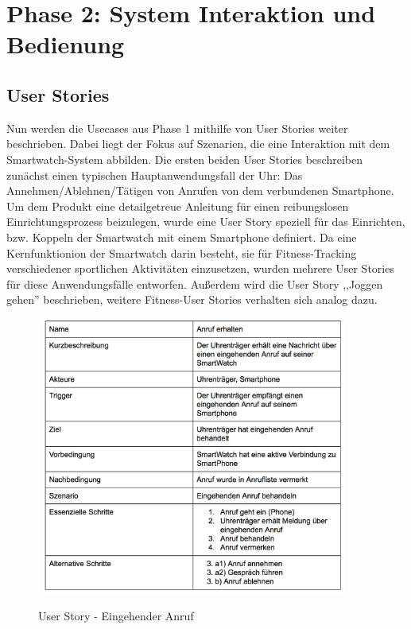 \chapter{Phase 2: System Interaktion und Bedienung}

\section{User Stories}

Nun werden die Usecases aus Phase 1 mithilfe von User Stories weiter beschrieben. Dabei liegt der Fokus auf Szenarien, die eine Interaktion mit dem Smartwatch-System abbilden.
Die ersten beiden User Stories beschreiben zunächst einen typischen Hauptanwendungsfall der Uhr: Das Annehmen/Ablehnen/Tätigen von Anrufen von dem verbundenen Smartphone.
Um dem Produkt eine detailgetreue Anleitung für einen reibungslosen Einrichtungsprozess beizulegen, wurde eine User Story speziell für das Einrichten, bzw. Koppeln der Smartwatch mit einem Smartphone definiert.
Da eine Kernfunktionion der Smartwatch darin besteht, sie für Fitness-Tracking verschiedener sportlichen Aktivitäten einzusetzen, wurden mehrere User Stories für diese Anwendungsfälle entworfen. Außerdem wird die User Story ,,Joggen gehen'' beschrieben, weitere Fitness-User Stories verhalten sich analog dazu.
\begin{figure}[H]
\centering\
\includegraphics[width=10cm]{img/story_in}
\caption{User Story - Eingehender Anruf}\label{fig:story-in}
\end{figure}


